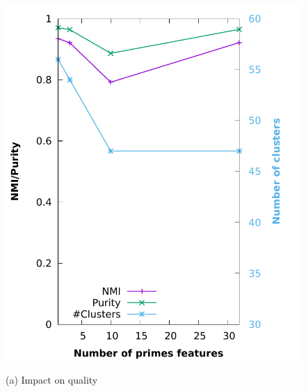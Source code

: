 \begin{figure}[h]
  \begin{minipage}{\linewidth}
    \centerline{\includegraphics[width=\linewidth]{../charts/param_analysis/primes_features_quality.pdf}}
    \centerline{(a) Impact on quality}
  \end{minipage}
  \begin{minipage}{\linewidth}

\end{minipage}
\end{figure}
